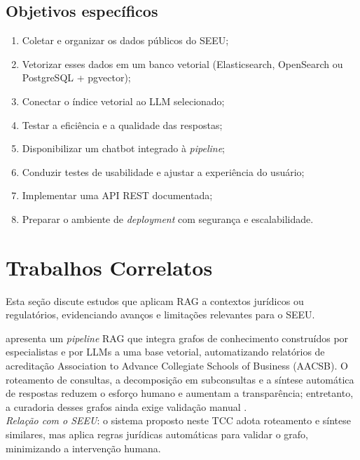 \subsection{Objetivos específicos}
\begin{enumerate}[label=\arabic*.]
  \item Coletar e organizar os dados públicos do SEEU;
  \item Vetorizar esses dados em um banco vetorial (Elasticsearch, OpenSearch
        ou PostgreSQL + pgvector);
  \item Conectar o índice vetorial ao LLM selecionado;
  \item Testar a eficiência e a qualidade das respostas;
  \item Disponibilizar um chatbot integrado à \emph{pipeline};
  \item Conduzir testes de usabilidade e ajustar a experiência do usuário;
  \item Implementar uma API REST documentada;
  \item Preparar o ambiente de \emph{deployment} com segurança e
        escalabilidade.
\end{enumerate}


\section{Trabalhos Correlatos}
\label{sec:trabalhos-correlatos}

Esta seção discute estudos que aplicam RAG a contextos jurídicos ou
regulatórios, evidenciando avanços e limitações relevantes para o SEEU.

 apresenta um \textit{pipeline} RAG que integra
grafos de conhecimento construídos por especialistas e por LLMs a uma base
vetorial, automatizando relatórios de acreditação Association to Advance
Collegiate Schools of Business (AACSB). O roteamento de consultas, a
decomposição em subconsultas e a síntese automática de respostas reduzem o
esforço humano e aumentam a transparência; entretanto, a curadoria desses
grafos ainda exige validação manual \cite{edwards2024hybrid}.\\
\emph{Relação com o SEEU}: o sistema proposto neste TCC adota roteamento e
síntese similares, mas aplica regras jurídicas automáticas para validar o
grafo, minimizando a intervenção humana.

